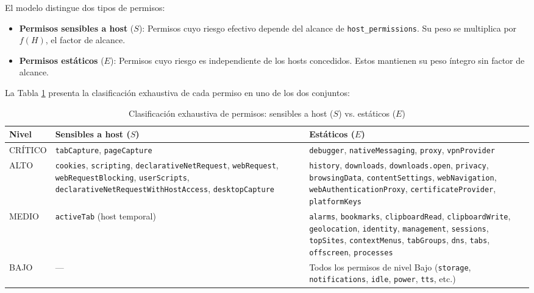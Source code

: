 \documentclass[12pt,oneside]{report}
\begin{document}
El modelo distingue dos tipos de permisos:

\begin{itemize}
    \item \textbf{Permisos sensibles a host} ($S$): Permisos cuyo riesgo efectivo depende del alcance de \texttt{host\_permissions}. Su peso se multiplica por $f(H)$, el factor de alcance.
    \item \textbf{Permisos estáticos} ($E$): Permisos cuyo riesgo es independiente de los hosts concedidos. Estos mantienen su peso íntegro sin factor de alcance.
\end{itemize}

La Tabla \ref{tab:se_classification} presenta la clasificación exhaustiva de cada permiso en uno de los dos conjuntos:

\begin{table}[!htbp]
\centering
\small
\begin{tabular}{|p{3cm}|p{5.5cm}|p{5.5cm}|}
\hline
\textbf{Nivel} & \textbf{Sensibles a host ($S$)} & \textbf{Estáticos ($E$)} \\
\hline
CRÍTICO & \texttt{tabCapture}, \texttt{pageCapture} & \texttt{debugger}, \texttt{nativeMessaging}, \texttt{proxy}, \texttt{vpnProvider} \\
\hline
ALTO & \texttt{cookies}, \texttt{scripting}, \texttt{declarativeNetRequest}, \texttt{webRequest}, \texttt{webRequestBlocking}, \texttt{userScripts}, \texttt{declarativeNetRequest\-WithHostAccess}, \texttt{desktopCapture} & \texttt{history}, \texttt{downloads}, \texttt{downloads.open}, \texttt{privacy}, \texttt{browsingData}, \texttt{contentSettings}, \texttt{webNavigation}, \texttt{webAuthentication\-Proxy}, \texttt{certificateProvider}, \texttt{platformKeys} \\
\hline
MEDIO & \texttt{activeTab} (host temporal) & \texttt{alarms}, \texttt{bookmarks}, \texttt{clipboard\-Read}, \texttt{clipboardWrite}, \texttt{geolocation}, \texttt{identity}, \texttt{management}, \texttt{sessions}, \texttt{topSites}, \texttt{context\-Menus}, \texttt{tabGroups}, \texttt{dns}, \texttt{tabs}, \texttt{offscreen}, \texttt{processes} \\
\hline
BAJO & --- & Todos los permisos de nivel Bajo (\texttt{storage}, \texttt{notifications}, \texttt{idle}, \texttt{power}, \texttt{tts}, etc.) \\
\hline
\end{tabular}
\caption{Clasificación exhaustiva de permisos: sensibles a host ($S$) vs. estáticos ($E$)}
\label{tab:se_classification}
\end{table}
\end{document}
